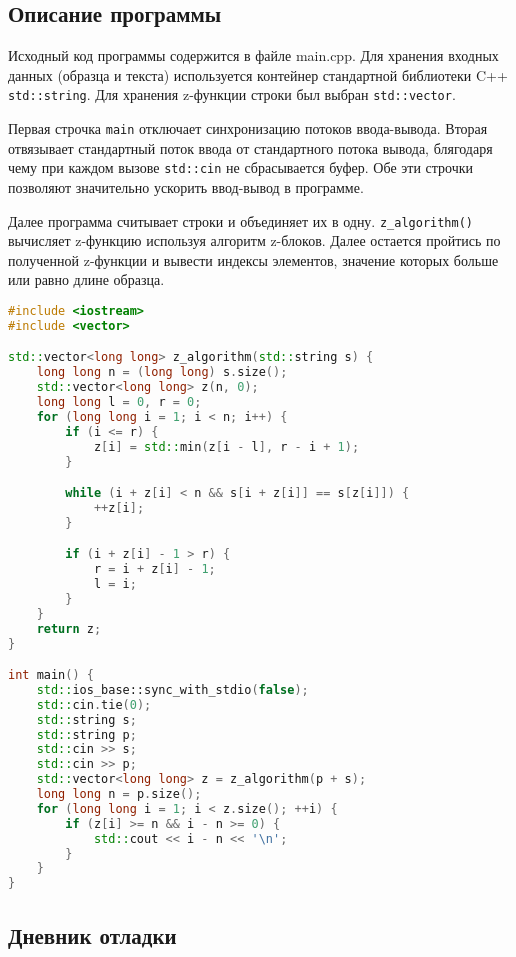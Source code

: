 \documentclass[12pt]{article}
\begin{document}
\subsection*{Описание программы}

Исходный код программы содержится в файле main.cpp. Для хранения входных данных (образца и текста) используется контейнер стандартной библиотеки C++ \texttt{std::string}. Для хранения z-функции строки был выбран \texttt{std::vector}.

Первая строчка \texttt{main} отключает синхронизацию потоков ввода-вывода. Вторая отвязывает стандартный поток ввода от стандартного потока вывода, блягодаря чему при каждом вызове \texttt{std::cin} не сбрасывается буфер. Обе эти строчки позволяют значительно ускорить ввод-вывод в программе.

Далее программа считывает строки и объединяет их в одну. \texttt{z\_algorithm()} вычисляет z-функцию используя алгоритм z-блоков. Далее остается пройтись по полученной z-функции и вывести индексы элементов, значение которых больше или равно длине образца.

\begin{lstlisting}[language=C++]
#include <iostream>
#include <vector>

std::vector<long long> z_algorithm(std::string s) {
    long long n = (long long) s.size();
    std::vector<long long> z(n, 0);
    long long l = 0, r = 0;
    for (long long i = 1; i < n; i++) {
        if (i <= r) {
            z[i] = std::min(z[i - l], r - i + 1);
        }

        while (i + z[i] < n && s[i + z[i]] == s[z[i]]) {
            ++z[i];
        }

        if (i + z[i] - 1 > r) {
            r = i + z[i] - 1;
            l = i;
        }
    }
    return z;
}

int main() {
    std::ios_base::sync_with_stdio(false);
	std::cin.tie(0);
    std::string s;
    std::string p;
    std::cin >> s;
    std::cin >> p;
    std::vector<long long> z = z_algorithm(p + s);
    long long n = p.size();
    for (long long i = 1; i < z.size(); ++i) {
        if (z[i] >= n && i - n >= 0) {
            std::cout << i - n << '\n';
        }
    }
}
\end{lstlisting}

\subsection*{Дневник отладки}
\end{document}
